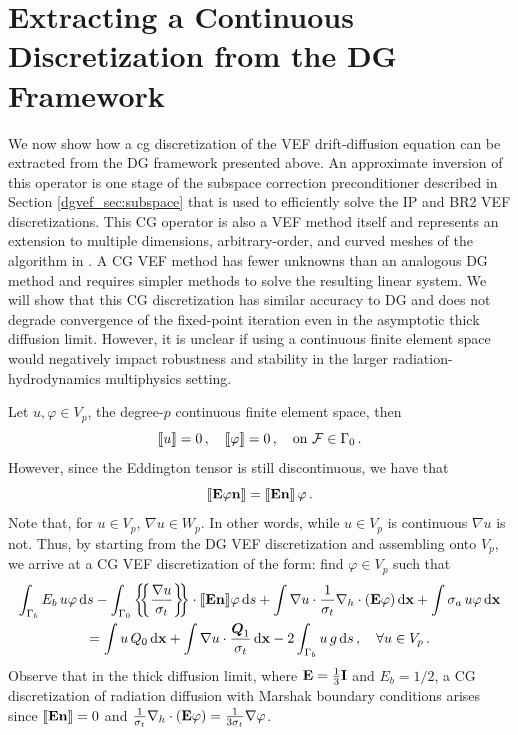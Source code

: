 \documentclass[../doc.tex]{subfiles}
\begin{document}
\section{Extracting a Continuous Discretization from the DG Framework} \label{dgvef_sec:cfem}
We now show how a \gls{cg} discretization of the VEF drift-diffusion equation can be extracted from the DG framework presented above. An approximate inversion of this operator is one stage of the subspace correction preconditioner described in Section \ref{dgvef_sec:subspace} that is used to efficiently solve the IP and BR2 VEF discretizations. This CG operator is also a VEF method itself and represents an extension to multiple dimensions, arbitrary-order, and curved meshes of the algorithm in \cite{two-level-independent-warsa}. A CG VEF method has fewer unknowns than an analogous DG method and requires simpler methods to solve the resulting linear system. We will show that this CG discretization has similar accuracy to DG and does not degrade convergence of the fixed-point iteration even in the asymptotic thick diffusion limit. However, it is unclear if using a continuous finite element space would negatively impact robustness and stability in the larger radiation-hydrodynamics multiphysics setting. 

Let $u,\varphi \in V_p$, the degree-$p$ continuous finite element space, then 
	\begin{equation}
		\left\llbracket u \right\rrbracket = 0 \,, \quad \left\llbracket\varphi \right\rrbracket = 0 \,, \quad \text{on} \ \mathcal{F}\in\Gamma_0 \,. 
	\end{equation}
However, since the Eddington tensor is still discontinuous, we have that 
	\begin{equation}
		\left\llbracket\boldsymbol{\mathrm{E}}\varphi\boldsymbol{\mathrm{n}} \right\rrbracket = \left\llbracket\boldsymbol{\mathrm{E}}\boldsymbol{\mathrm{n}} \right\rrbracket \varphi \,. 
	\end{equation}
Note that, for $u\in V_p$, $\nabla u \in W_p$. In other words, while $u\in V_p$ is continuous $\nabla u$ is not. Thus, by starting from the DG VEF discretization and assembling onto $V_p$, we arrive at a CG VEF discretization of the form: find $\varphi \in V_p$ such that 
	\begin{multline} \label{dgvef:cg}
		\int_{\Gamma_b} E_b\, u \varphi \ud s - \int_{\Gamma_0} \avg{\frac{\nabla u}{\sigma_t}} \cdot \jump{\E\n}\!\varphi \ud s 
		+ \int \nabla u \cdot \frac{1}{\sigma_t}\nablah\cdot\paren{\E\varphi} \ud \x + \int \sigma_a\, u \varphi \ud \x \\ 
		= \int u\, Q_0 \ud \x + \int \nabla u \cdot \frac{\vec{Q}_1}{\sigma_t} \ud \x - 2\int_{\Gamma_b} u\, g \ud s \,, \quad \forall u \in V_p \,. 
	\end{multline}
Observe that in the thick diffusion limit, where $\boldsymbol{\mathrm{E}} = \frac{1}{3}\boldsymbol{\mathrm{I}}$ and $E_b = 1/2$, a CG discretization of radiation diffusion with Marshak boundary conditions arises since $\left\llbracket\boldsymbol{\mathrm{E}}\boldsymbol{\mathrm{n}} \right\rrbracket = 0$ and $\frac{1}{\sigma_t}\nabla_h\cdot\left( \boldsymbol{\mathrm{E}}\varphi \right) = \frac{1}{3\sigma_t}\nabla \varphi$. 
\end{document}
